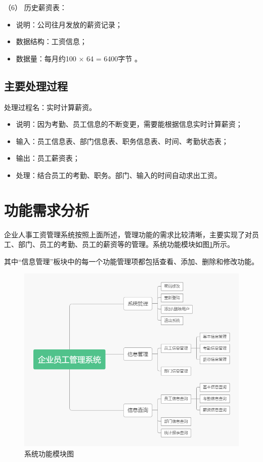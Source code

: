 \documentclass[withoutpreface,bwprint]{cumcmthesis} %
\newcommand{\kuohao}[1]{ \noindent （#1）}
\begin{document}
\kuohao{6} 历史薪资表：
\begin{itemize}
\item 说明：公司往月发放的薪资记录；
\item 数据结构：工资信息；
\item 数据量：每月约100 $\times$ 64 = 6400字节 。
\end{itemize}

\subsection{主要处理过程}

处理过程名：实时计算薪资。

\begin{itemize}
\item 说明：因为考勤、员工信息的不断变更，需要能根据信息实时计算薪资；
\item 输入：员工信息表、部门信息表、职务信息表、时间、考勤状态表；
\item 输出：员工薪资表；
\item 处理：结合员工的考勤、职务。部门、输入的时间自动求出工资。
\end{itemize}



\section{功能需求分析}

企业人事工资管理系统按照上面所述，管理功能的需求比较清晰，主要实现了对员工、部门、员工的考勤、员工的薪资等的管理。系统功能模块如图\ref{gongneng}所示。 \par 
	其中“信息管理”板块中的每一个功能管理项都包括查看、添加、删除和修改功能。
\begin{figure}[H]
    \centering
    \includegraphics[width=1\linewidth]{gongneng1}
    \caption{系统功能模块图}
    \label{gongneng}
\end{figure}
\end{document}
